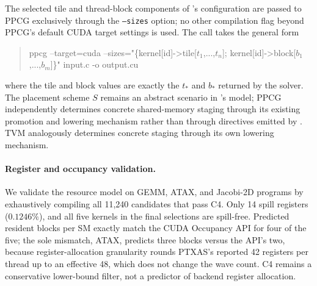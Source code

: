 The selected tile and thread-block components of \name's configuration are passed to PPCG exclusively through the \texttt{--sizes} option; no other compilation flag beyond PPCG's default CUDA target settings is used. The call takes the general form
\begin{quote}
\ttfamily\footnotesize
ppcg --target=cuda --sizes="\{kernel[id]->tile[$t_1$,...,$t_n$]; kernel[id]->block[$b_1$,...,$b_m$]\}" input.c -o output.cu
\end{quote}
where the tile and block values are exactly the \(t_*\) and \(b_*\) returned by the solver. The placement scheme \(S\) remains an abstract scenario in \name's model; PPCG independently determines concrete shared-memory staging through its existing promotion and lowering mechanism rather than through directives emitted by \name. TVM analogously determines concrete staging through its own lowering mechanism. 

\paragraph{Register and occupancy validation.}
We validate the resource model on GEMM, ATAX, and Jacobi-2D programs by exhaustively compiling all 11,240 candidates that pass C4. Only 14 spill registers (\(0.1246\%\)), and all five kernels in the final \name selections are spill-free. Predicted resident blocks per SM exactly match the CUDA Occupancy API for four of the five; the sole mismatch, ATAX, predicts three blocks versus the API's two, because register-allocation granularity rounds PTXAS's reported 42 registers per thread up to an effective 48, which does not change the wave count. C4 remains a conservative lower-bound filter, not a predictor of backend register allocation. 


